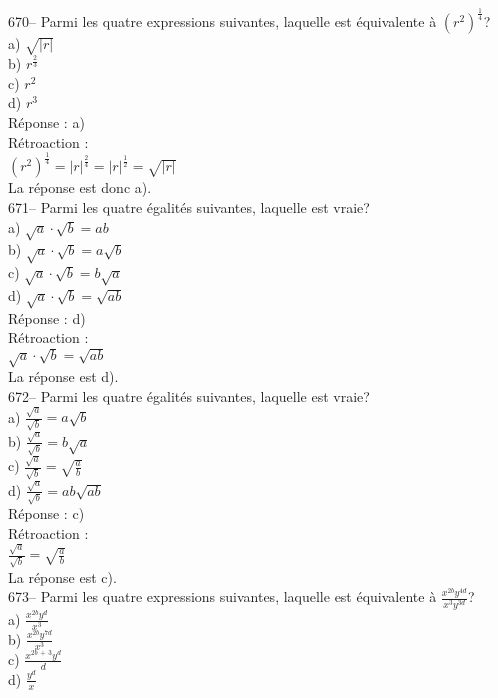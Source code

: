﻿\documentclass[letterpaper, 12pt]{article}
\begin{document}
670-- Parmi les quatre expressions suivantes, laquelle est \'equivalente \`a
$\left( r^{2}\right)^\frac{1}{4}$?\\
a) $\sqrt{|r|}$\\
b) $r^{\frac{2}{3}}$\\
c) $r^{2}$\\
d) $r^{3}$\\

R\'eponse : a)\\

R\'etroaction : \\
$\left( r^{2}\right)^\frac{1}{4}=|r|^\frac{2}{4}=|r|^\frac{1}{2}=\sqrt{|r|}$\\
La r\'eponse est donc a).\\

671-- Parmi les quatre \'egalit\'es suivantes, laquelle est vraie?\\
a) $\sqrt{a}\cdot\sqrt{b}=ab$\\
b) $\sqrt{a}\cdot\sqrt{b}=a\sqrt{b}$\\
c) $\sqrt{a}\cdot\sqrt{b}=b\sqrt{a}$\\
d) $\sqrt{a}\cdot\sqrt{b}=\sqrt{ab}$\\

R\'eponse : d)\\

R\'etroaction : \\
$\sqrt{a}\cdot\sqrt{b}=\sqrt{ab}$\\
La r\'eponse est d).\\

672-- Parmi les quatre \'egalit\'es suivantes, laquelle est vraie?\\
a) $\frac{\sqrt{a}}{\sqrt{b}}=a\sqrt{b}$\\[2mm]
b) $\frac{\sqrt{a}}{\sqrt{b}}=b\sqrt{a}$\\[2mm]
c) $\frac{\sqrt{a}}{\sqrt{b}}=\sqrt{\frac{a}{b}}$\\[2mm]
d) $\frac{\sqrt{a}}{\sqrt{b}}=ab\sqrt{ab}$\\

R\'eponse : c)\\

R\'etroaction : \\[2mm]
$\frac{\sqrt{a}}{\sqrt{b}}=\sqrt{\frac{a}{b}}$\\[2mm]
La r\'eponse est c).\\

673-- Parmi les quatre expressions suivantes, laquelle est \'equivalente \`a
$\frac{x^{2b}y^{4d}}{x^{3}y^{3d}}$?\\
a) $\frac{x^{2b}y^{d}}{x^{3}}$\\[2mm]
b) $\frac{x^{2b}y^{7d}}{x^{3}}$\\[2mm]
c) $\frac{x^{2b\,+\,3}y^{d}}{d}$\\[2mm]
d) $\frac{y^{d}}{x}$\\
\end{document}
